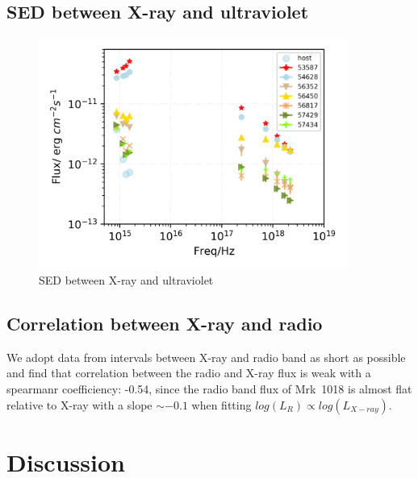 \documentclass{aastex63}
\begin{document}
\subsection{SED between X-ray and ultraviolet}\label{subsec:xray-uvot-sed}
\begin{figure}
\centering
	\includegraphics[width=0.9\textwidth]{./pic/Mrk1018_sed_uvot_xray-4band-multi.png}
    \caption{SED between X-ray and ultraviolet}
    \label{fig:xray-uvot-sed}
\end{figure}



\subsection{Correlation between X-ray and radio}\label{subsec:xray-radio}
We adopt data from intervals between X-ray and radio band as short as possible and find that correlation between the radio and X-ray flux is weak with a spearmanr coefficiency: -0.54, since the radio band flux of Mrk~1018 is almost flat relative to X-ray with a slope $\sim -0.1$ when fitting $log(L_{R})\propto log(L_{X-ray})$. 












\section{Discussion}\label{sec:discussion}
\end{document}
